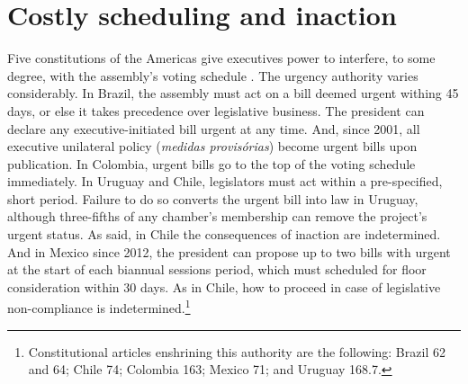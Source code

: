 \documentclass[letter,12pt]{article}
\begin{document}



\section{Costly scheduling and inaction}

Five constitutions of the Americas give executives power to interfere, to some degree, with the assembly's voting schedule \citep{morgenstern.2002b}. The urgency authority varies considerably. In Brazil, the assembly must act on a bill deemed urgent withing 45 days, or else it takes precedence over legislative business. The president can declare any executive-initiated bill urgent at any time. And, since 2001, all executive unilateral policy (\emph{medidas provis\'orias}) become urgent bills upon publication. In Colombia, urgent bills go to the top of the voting schedule immediately. In Uruguay and Chile, legislators must act within a pre-specified, short period. Failure to do so converts the urgent bill into law in Uruguay, although three-fifths of any chamber's membership can remove the project's urgent status. As said, in Chile the consequences of inaction are indetermined. And in Mexico since 2012, the president can propose up to two bills with urgent at the start of each biannual sessions period, which must scheduled for floor consideration within 30 days. As in Chile, how to proceed in case of legislative non-compliance is indetermined.\footnote{Constitutional articles enshrining this authority are the following: Brazil 62 and 64; Chile 74; Colombia 163; Mexico 71; and Uruguay 168.7.}
\end{document}
